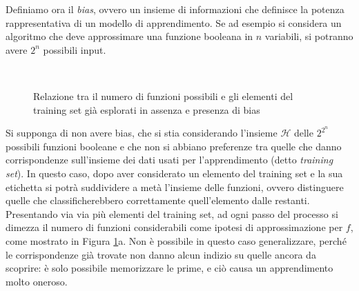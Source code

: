 \documentclass[oneside, openany]{book}
\begin{document}
		Definiamo ora il \textit{bias}, ovvero un insieme di informazioni che definisce la potenza rappresentativa di un modello di apprendimento.
		Se ad esempio si considera un algoritmo che deve approssimare una funzione booleana in $n$ variabili, si potranno avere $2^n$ possibili input. 
		\begin{figure}
			\centering
			 \quad
			 \\
			\caption{Relazione tra il numero di funzioni possibili e gli elementi del training set già esplorati in assenza e presenza di bias}
			\label{fig:bias}
			
		\end{figure}
		Si supponga di non avere bias, che si stia considerando l'insieme $\mathcal{H}$ delle $2^{2^n}$ possibili funzioni booleane e che non si abbiano preferenze tra quelle che danno corrispondenze sull'insieme dei dati usati per l'apprendimento (detto \textit{training set}). In questo caso, dopo aver considerato un elemento del training set e la sua etichetta si potrà suddividere a metà l'insieme delle funzioni, ovvero distinguere quelle che classificherebbero correttamente quell'elemento dalle restanti. Presentando via via più elementi del training set, ad ogni passo del processo si dimezza il numero di funzioni considerabili come ipotesi di approssimazione per $f$, come mostrato in Figura \ref{fig:bias}a. Non è possibile in questo caso generalizzare, perché le corrispondenze già trovate non danno alcun indizio su quelle ancora da scoprire: è solo possibile memorizzare le prime, e ciò causa un apprendimento molto oneroso.\newline
\end{document}
